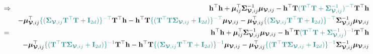 \documentclass[12pt]{article}
\newcommand{\0}{\mathbf{0}}
\begin{document}
\begin{eqnarray*}
& \Rightarrow & \mathbf{h}^{\top} \mathbf{h} + \boldsymbol{\mu}_{ij}^{\top} \boldsymbol{\Sigma}_{\boldsymbol{\mathcal{V}}, ij}^{-1} \boldsymbol{\mu}_{\boldsymbol{\mathcal{V}}, ij} -  \mathbf{h}^{\top} \mathbf{T}  \textcolor{kaustgreen}{( \mathbf{T}^{\top} \mathbf{T} + \boldsymbol{\Sigma}_{\boldsymbol{\mathcal{V}}, ij}^{-1} )^{-\top}} \mathbf{T}^{\top} \mathbf{h} \\
&& - \boldsymbol{\mu}_{\boldsymbol{\mathcal{V}}, ij}^{\top}  \textcolor{kaustgreen}{ \{ ( \boldsymbol{\Sigma}_{\boldsymbol{\mathcal{V}}, ij} \mathbf{T}^{\top} \mathbf{T} + \mathbf{I}_{2d} ) \}^{-\top}} \mathbf{T}^{\top} \mathbf{h} -  \mathbf{h}^{\top} \mathbf{T} \textcolor{kaustgreen}{ \{ ( \mathbf{T}^{\top} \mathbf{T} \boldsymbol{\Sigma}_{\boldsymbol{\mathcal{V}}, ij} + \mathbf{I}_{2d} ) \}^{-\top}} \boldsymbol{\mu}_{\boldsymbol{\mathcal{V}}, ij} -  \boldsymbol{\mu}_{\boldsymbol{\mathcal{V}}, ij}^{\top} \textcolor{kaustgreen}{ \{ ( \boldsymbol{\Sigma}_{\boldsymbol{\mathcal{V}}, ij} \mathbf{T}^{\top} \mathbf{T} + \mathbf{I}_{2d} ) \}^{-\top}} \boldsymbol{\Sigma}_{\boldsymbol{\mathcal{V}}, ij}^{-1}\boldsymbol{\mu}_{\boldsymbol{\mathcal{V}}, ij} \\
& = & \mathbf{h}^{\top} \mathbf{h} + \boldsymbol{\mu}_{ij}^{\top} \boldsymbol{\Sigma}_{\boldsymbol{\mathcal{V}}, ij}^{-1} \boldsymbol{\mu}_{\boldsymbol{\mathcal{V}}, ij} -  \mathbf{h}^{\top} \mathbf{T}  \textcolor{kaustgreen}{( \mathbf{T}^{\top} \mathbf{T} + \boldsymbol{\Sigma}_{\boldsymbol{\mathcal{V}}, ij}^{-1} )^{-1}} \mathbf{T}^{\top} \mathbf{h} \\
&& - \boldsymbol{\mu}_{\boldsymbol{\mathcal{V}}, ij}^{\top}  \textcolor{kaustgreen}{ \{ ( \mathbf{T}^{\top} \mathbf{T} \boldsymbol{\Sigma}_{\boldsymbol{\mathcal{V}}, ij} + \mathbf{I}_{2d} ) \}^{-1}} \mathbf{T}^{\top} \mathbf{h} -  \mathbf{h}^{\top} \mathbf{T} \textcolor{kaustgreen}{ \{ ( \boldsymbol{\Sigma}_{\boldsymbol{\mathcal{V}}, ij} \mathbf{T}^{\top} \mathbf{T}  + \mathbf{I}_{2d} ) \}^{-1}} \boldsymbol{\mu}_{\boldsymbol{\mathcal{V}}, ij} -  \boldsymbol{\mu}_{\boldsymbol{\mathcal{V}}, ij}^{\top} \textcolor{kaustgreen}{ \{ ( \mathbf{T}^{\top} \mathbf{T} \boldsymbol{\Sigma}_{\boldsymbol{\mathcal{V}}, ij}  + \mathbf{I}_{2d} ) \}^{-1}} \boldsymbol{\Sigma}_{\boldsymbol{\mathcal{V}}, ij}^{-1}\boldsymbol{\mu}_{\boldsymbol{\mathcal{V}}, ij} 
\end{eqnarray*}
\end{document}
